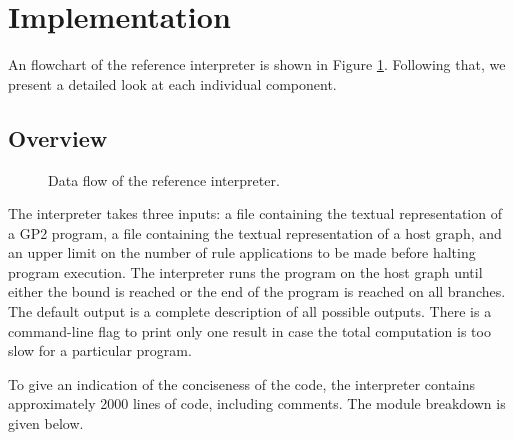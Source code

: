 \section{Implementation}

An flowchart of the reference interpreter is shown in Figure \ref{fig:architecture}. Following that, we present a detailed look at each individual component.

\subsection{Overview}

\begin{figure}
\centering

\caption{Data flow of the reference interpreter.} \label{fig:architecture}
\end{figure}

The interpreter takes three inputs: a file containing the textual representation of a GP2 program, a file containing the textual representation of a host graph, and an upper limit on the number of rule applications to be made before halting program execution. The interpreter runs the program on the host graph until either the bound is reached or the end of the program is reached on all branches. The default output is a complete description of all possible outputs. There is a command-line flag to print only one result in case the total computation is too slow for a particular program.

To give an indication of the conciseness of the code, the interpreter contains approximately 2000 lines of code, including comments. The module breakdown is given below.

